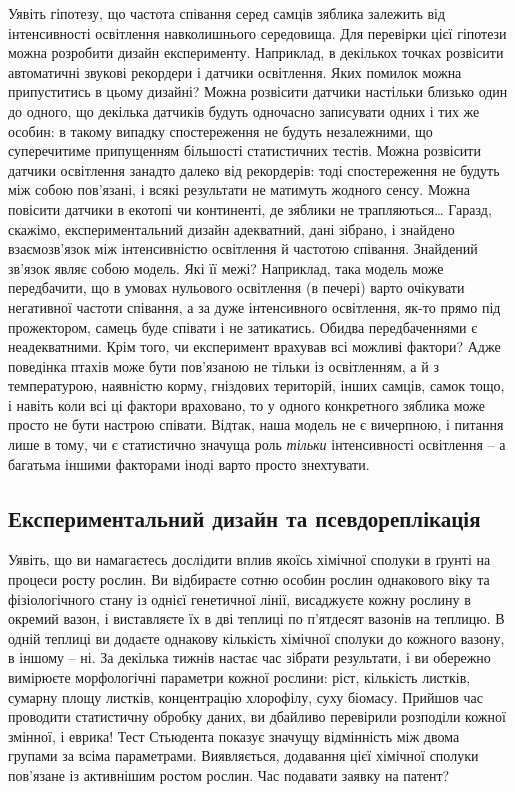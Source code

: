 \documentclass[
  11pt,
]{book}
\begin{document}
Уявіть гіпотезу, що частота співання серед самців зяблика залежить від інтенсивності освітлення навколишнього середовища. Для перевірки цієї гіпотези можна розробити дизайн експерименту. Наприклад, в декількох точках розвісити автоматичні звукові рекордери і датчики освітлення. Яких помилок можна припуститись в цьому дизайні? Можна розвісити датчики настільки близько один до одного, що декілька датчиків будуть одночасно записувати одних і тих же особин: в такому випадку спостереження не будуть незалежними, що суперечитиме припущенням більшості статистичних тестів. Можна розвісити датчики освітлення занадто далеко від рекордерів: тоді спостереження не будуть між собою пов'язані, і всякі результати не матимуть жодного сенсу. Можна повісити датчики в екотопі чи континенті, де зяблики не трапляються\ldots{} Гаразд, скажімо, експериментальний дизайн адекватний, дані зібрано, і знайдено взаємозв'язок між інтенсивністю освітлення й частотою співання. Знайдений зв'язок являє собою модель. Які її межі? Наприклад, така модель може передбачити, що в умовах нульового освітлення (в печері) варто очікувати негативної частоти співання, а за дуже інтенсивного освітлення, як-то прямо під прожектором, самець буде співати і не затикатись. Обидва передбаченнями є неадекватними. Крім того, чи експеримент врахував всі можливі фактори? Адже поведінка птахів може бути пов'язаною не тільки із освітленням, а й з температурою, наявністю корму, гніздових територій, інших самців, самок тощо, і навіть коли всі ці фактори враховано, то у одного конкретного зяблика може просто не бути настрою співати. Відтак, наша модель не є вичерпною, і питання лише в тому, чи є статистично значуща роль \emph{тільки} інтенсивності освітлення -- а багатьма іншими факторами іноді варто просто знехтувати.

\subsection{Експериментальний дизайн та псевдореплікація}\label{pseudoreplication}

Уявіть, що ви намагаєтесь дослідити вплив якоїсь хімічної сполуки в ґрунті на процеси росту рослин. Ви відбираєте сотню особин рослин однакового віку та фізіологічного стану із однієї генетичної лінії, висаджуєте кожну рослину в окремий вазон, і виставляєте їх в дві теплиці по п'ятдесят вазонів на теплицю. В одній теплиці ви додаєте однакову кількість хімічної сполуки до кожного вазону, в іншому -- ні. За декілька тижнів настає час зібрати результати, і ви обережно вимірюєте морфологічні параметри кожної рослини: ріст, кількість листків, сумарну площу листків, концентрацію хлорофілу, суху біомасу. Прийшов час проводити статистичну обробку даних, ви дбайливо перевірили розподіли кожної змінної, і еврика! Тест Стьюдента показує значущу відмінність між двома групами за всіма параметрами. Виявляється, додавання цієї хімічної сполуки пов'язане із активнішим ростом рослин. Час подавати заявку на патент?
\end{document}
